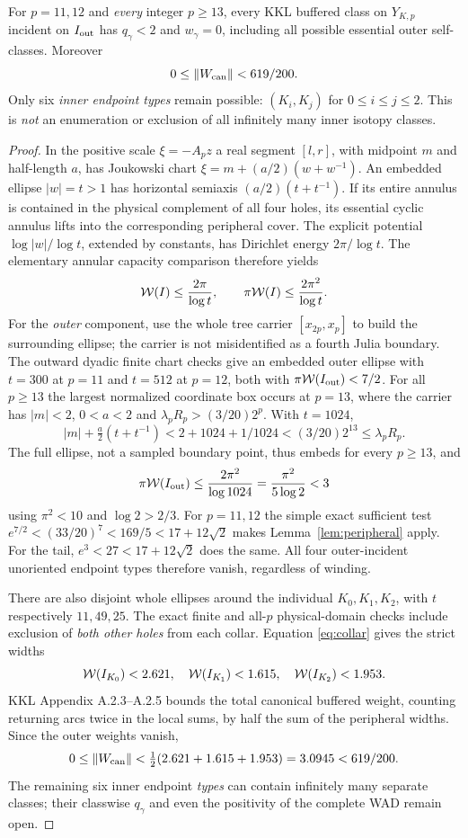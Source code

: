 \begin{theorem}\label{thm:buffer}
For $p=11,12$ and
\emph{every} integer $p\ge13$,
every KKL buffered class on
$Y_{K,p}$ incident on
$I_{\rm out}$ has $q_\gamma<2$
and $w_\gamma=0$,
including all possible
essential outer self-classes.
Moreover
\[
 0\le\lVert W_{\rm can}\rVert<619/200.
\]
Only six \emph{inner
endpoint types} remain
possible: $(K_i,K_j)$
for $0\le i\le j\le2$.
This is \emph{not}
an enumeration or exclusion
of all infinitely many
inner isotopy classes.
\end{theorem}
\begin{proof}
In the positive scale
$\xi=-A_pz$ a real segment
$[l,r]$, with midpoint
$m$ and half-length $a$,
has Joukowski chart
$\xi=m+(a/2)(w+w^{-1})$.
An embedded ellipse
$|w|=t>1$ has horizontal
semiaxis $(a/2)(t+t^{-1})$.
If its entire annulus
is contained in the
physical complement
of all four holes,
its essential cyclic
annulus lifts into the
corresponding peripheral
cover.  The explicit
potential $\log|w|/\log t$,
extended by constants,
has Dirichlet energy
$2\pi/\log t$.
The elementary annular
capacity comparison
therefore yields
\begin{equation}\label{eq:collar}
 \mathcal W(I)\le\frac{2\pi}{\log t},
 \qquad \pi\mathcal W(I)\le
 \frac{2\pi^2}{\log t}.
\end{equation}
For the \emph{outer}
component, use the whole
tree carrier
$[x_{2p},x_p]$ to build
the surrounding ellipse;
the carrier is not
misidentified as a
fourth Julia boundary.
The outward dyadic
finite chart checks give
an embedded outer ellipse
with $t=300$ at $p=11$
and $t=512$ at $p=12$,
both with
$\pi\mathcal W(I_{\rm out})<7/2$.
For all $p\ge13$ the
largest normalized
coordinate box occurs at
$p=13$, where the carrier
has $|m|<2$, $0<a<2$ and
$\lambda_pR_p>(3/20)2^p$.
With $t=1024$,
\[
 |m|+\tfrac a2(t+t^{-1})
 <2+1024+1/1024
 <(3/20)2^{13}
 \le\lambda_pR_p.
\]
The full ellipse, not a
sampled boundary point,
thus embeds for every
$p\ge13$, and
\[
 \pi\mathcal W(I_{\rm out})\le
 \frac{2\pi^2}{\log 1024}
 =\frac{\pi^2}{5\log2}<3
\]
using $\pi^2<10$
and $\log2>2/3$.
For $p=11,12$ the
simple exact sufficient
test $e^{7/2}<(33/20)^7
<169/5<17+12\sqrt2$
makes Lemma~\ref{lem:peripheral}
apply.  For the tail,
$e^3<27<17+12\sqrt2$
does the same.  All
four outer-incident
unoriented endpoint
types therefore vanish,
regardless of winding.

There are also disjoint
whole ellipses around
the individual $K_0,K_1,K_2$,
with $t$ respectively
$11,49,25$.  The exact
finite and all-$p$
physical-domain checks
include exclusion of
\emph{both other holes}
from each collar.
Equation \eqref{eq:collar}
gives the strict widths
\[
 \mathcal W(I_{K_0})<2.621,\quad
 \mathcal W(I_{K_1})<1.615,\quad
 \mathcal W(I_{K_2})<1.953.
\]
KKL Appendix A.2.3--A.2.5
bounds the total canonical
buffered weight, counting
returning arcs twice in
the local sums, by half
the sum of the peripheral
widths.  Since the outer
weights vanish,
\[
 0\le\lVert W_{\rm can}\rVert
 <\tfrac12(2.621+1.615+1.953)
 =3.0945<619/200.
\]
The remaining six
inner endpoint \emph{types}
can contain infinitely
many separate classes;
their classwise $q_\gamma$
and even the positivity
of the complete WAD
remain open.
\end{proof}

